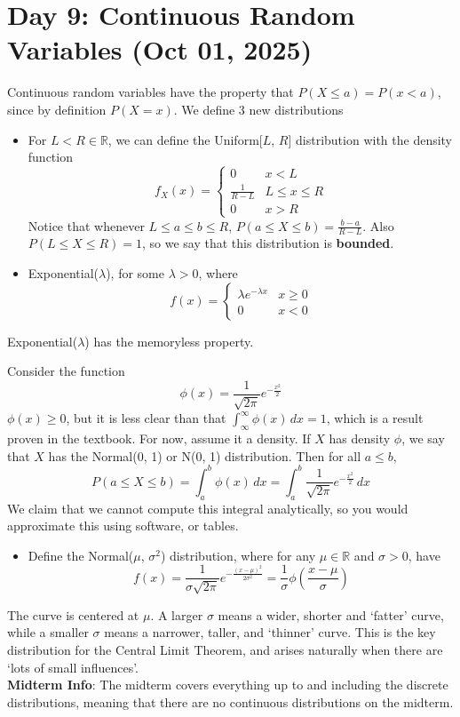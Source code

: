 \section{Day 9: Continuous Random Variables (Oct 01, 2025)}

Continuous random variables have the property that $P(X \leq a) = P(x < a)$, since by definition $P(X = x)$. We define 3 new distributions

\begin{itemize}
\item For $L < R \in \mathbb{R}$, we can define the Uniform[$L$, $R$] distribution with the density function
\[
f_X(x) = \begin{cases}
    0 & x < L \\
    \frac{1}{R-L} & L \leq x \leq R \\
    0 & x > R
\end{cases}
\]
Notice that whenever $L \leq a \leq b \leq R$, $P(a \leq X \leq b) = \frac{b-a}{R - L}$. Also $P(L \leq X \leq R) = 1$, so we say that this distribution is \textbf{bounded}.
    \item Exponential($\lambda$), for some $\lambda > 0$, where
    \[
    f(x) = \begin{cases}
        \lambda e^{-\lambda x} & x \geq 0 \\
        0 & x < 0 
    \end{cases}
    \]
\end{itemize}

\begin{simplethm}
    Exponential($\lambda$) has the memoryless property.
\end{simplethm}

\noindent Consider the function
\[
\phi(x) = \frac{1}{\sqrt{2 \pi}} e^{- \frac{x^2}{2}}
\]
$\phi(x) \geq 0$, but it is less clear than that $\int_ \infty ^ \infty \phi(x) \, dx = 1$, which is a result proven in the textbook. For now, assume it a density. If $X$ has density $\phi$, we say that $X$ has the Normal(0, 1) or N(0, 1) distribution. Then for all $a \leq b$,
\[
P(a \leq X \leq b) = \int_a^b \phi(x) \, dx = \int_a^b \frac{1}{\sqrt{2\pi}} e^{- \frac{x^2}{2}} \, dx
\]
We claim that we cannot compute this integral analytically, so you would approximate this using software, or tables.

\begin{itemize}
\item Define the Normal($\mu$, $\sigma^2$) distribution, where for any $\mu \in \mathbb{R}$ and $\sigma > 0$, have
\[
f(x) = \frac{1}{\sigma \sqrt{2\pi}} e^{- \frac{(x-\mu)^2}{2 \sigma^2}} = \frac{1}{\sigma} \phi(\frac{x - \mu}{\sigma})
\]
\end{itemize}

\noindent The curve is centered at $\mu$. A larger $\sigma$ means a wider, shorter and `fatter' curve, while a smaller $\sigma$ means a narrower, taller, and `thinner' curve. This is the key distribution for the Central Limit Theorem, and arises naturally when there are `lots of small influences'. \\

\noindent \textbf{Midterm Info}: The midterm covers everything up to and including the discrete distributions, meaning that there are no continuous distributions on the midterm.
